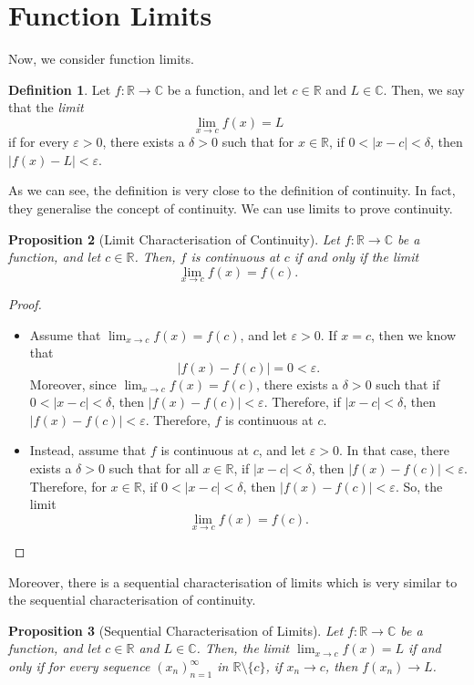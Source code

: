 \documentclass[a4paper, openany]{memoir}
\theoremstyle{definition}
\newtheorem{definition}{Definition}[section]
\theoremstyle{plain}
\newtheorem{proposition}[definition]{Proposition}
\begin{document}
\section{Function Limits}
Now, we consider function limits.
\begin{definition}
Let $f: \mathbb{R} \to \mathbb{C}$ be a function, and let $c \in \mathbb{R}$ and $L \in \mathbb{C}$. Then, we say that the \emph{limit} 
\[\lim_{x \to c} f(x) = L\]
if for every $\varepsilon > 0$, there exists a $\delta > 0$ such that for $x \in \mathbb{R}$, if $0 < |x - c| < \delta$, then $|f(x) - L| < \varepsilon$.
\end{definition}
\noindent As we can see, the definition is very close to the definition of continuity. In fact, they generalise the concept of continuity. We can use limits to prove continuity.
\begin{proposition}[Limit Characterisation of Continuity]
Let $f: \mathbb{R} \to \mathbb{C}$ be a function, and let $c \in \mathbb{R}$. Then, $f$ is continuous at $c$ if and only if the limit
\[\lim_{x \to c} f(x) = f(c).\]
\end{proposition}
\begin{proof}
\hspace*{0pt}
\begin{itemize}
    \item Assume that $\lim_{x \to c} f(x) = f(c)$, and let $\varepsilon > 0$. If $x = c$, then we know that
    \[|f(x) - f(c)| = 0 < \varepsilon.\]
    Moreover, since $\lim_{x \to c} f(x) = f(c)$, there exists a $\delta > 0$ such that if $0 < |x - c| < \delta$, then $|f(x) - f(c)| < \varepsilon$. Therefore, if $|x - c| < \delta$, then $|f(x) - f(c)| < \varepsilon$. Therefore, $f$ is continuous at $c$.
    
    \item Instead, assume that $f$ is continuous at $c$, and let $\varepsilon > 0$. In that case, there exists a $\delta > 0$ such that for all $x \in \mathbb{R}$, if $|x - c| < \delta$, then $|f(x) - f(c)| < \varepsilon$. Therefore, for $x \in \mathbb{R}$, if $0 < |x - c| < \delta$, then $|f(x) - f(c)| < \varepsilon$. So, the limit
    \[\lim_{x \to c} f(x) = f(c).\]
\end{itemize}
\end{proof}
\noindent Moreover, there is a sequential characterisation of limits which is very similar to the sequential characterisation of continuity.
\begin{proposition}[Sequential Characterisation of Limits]
Let $f: \mathbb{R} \to \mathbb{C}$ be a function, and let $c\in \mathbb{R}$ and $L \in \mathbb{C}$. Then, the limit $\lim_{x \to c} f(x) = L$ if and only if for every sequence $(x_n)_{n=1}^{\infty}$ in $\mathbb{R} \setminus \{c\}$, if $x_n \to c$, then $f(x_n) \to L$.
\end{proposition}
\end{document}

